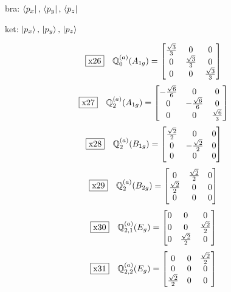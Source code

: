 \documentclass[fleqn,10pt,landscape]{jsarticle}
\begin{document}
\noindent\textbullet\, bra: $\bra{p_{x}},\, \bra{p_{y}},\, \bra{p_{z}}$

\noindent\textbullet\, ket: $\ket{p_{x}},\, \ket{p_{y}},\, \ket{p_{z}}$

\begin{dmath*}
\fbox{x26}\quad \mathbb{Q}_{0}^{(a)}(A_{1g})=\begin{bmatrix} \frac{\sqrt{3}}{3} & 0 & 0 \\ 0 & \frac{\sqrt{3}}{3} & 0 \\ 0 & 0 & \frac{\sqrt{3}}{3} \end{bmatrix}
\end{dmath*}
\begin{dmath*}
\fbox{x27}\quad \mathbb{Q}_{2}^{(a)}(A_{1g})=\begin{bmatrix} - \frac{\sqrt{6}}{6} & 0 & 0 \\ 0 & - \frac{\sqrt{6}}{6} & 0 \\ 0 & 0 & \frac{\sqrt{6}}{3} \end{bmatrix}
\end{dmath*}
\begin{dmath*}
\fbox{x28}\quad \mathbb{Q}_{2}^{(a)}(B_{1g})=\begin{bmatrix} \frac{\sqrt{2}}{2} & 0 & 0 \\ 0 & - \frac{\sqrt{2}}{2} & 0 \\ 0 & 0 & 0 \end{bmatrix}
\end{dmath*}
\begin{dmath*}
\fbox{x29}\quad \mathbb{Q}_{2}^{(a)}(B_{2g})=\begin{bmatrix} 0 & \frac{\sqrt{2}}{2} & 0 \\ \frac{\sqrt{2}}{2} & 0 & 0 \\ 0 & 0 & 0 \end{bmatrix}
\end{dmath*}
\begin{dmath*}
\fbox{x30}\quad \mathbb{Q}_{2,1}^{(a)}(E_{g})=\begin{bmatrix} 0 & 0 & 0 \\ 0 & 0 & \frac{\sqrt{2}}{2} \\ 0 & \frac{\sqrt{2}}{2} & 0 \end{bmatrix}
\end{dmath*}
\begin{dmath*}
\fbox{x31}\quad \mathbb{Q}_{2,2}^{(a)}(E_{g})=\begin{bmatrix} 0 & 0 & \frac{\sqrt{2}}{2} \\ 0 & 0 & 0 \\ \frac{\sqrt{2}}{2} & 0 & 0 \end{bmatrix}
\end{dmath*}
\end{document}
